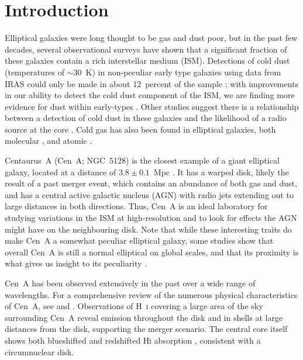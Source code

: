 \documentclass[useAMS,usenatbib,usegraphicx]{mn2e}
\begin{document}
\section{Introduction}\label{sec:intro}
Elliptical galaxies were long thought to be gas and dust poor, but in
the past few decades, several observational surveys 
have shown that a significant fraction of these galaxies contain a rich interstellar
medium (ISM).  Detections of cold dust (temperatures of $\sim 30$~K) in non-peculiar early type galaxies using data from IRAS could only be made in about 12~percent of the sample \citep[e.g.][]{1998ApJ...499..670B}; with improvements in our ability to detect the cold dust component of the ISM, we are finding more evidence for dust within early-types \citep[e.g.][]{2004ApJS..151..237T, 2004A&A...416...41X,2008ApJ...677..249L, 2009AJ....137.3053Y, Smith_2012_in_press}.  Other studies suggest there is a relationship between a detection of cold
dust in these galaxies and the likelihood of a radio source at the core \citep[e.g.][]{1989ApJ...337..209W}.  Cold gas has also been found in elliptical galaxies, both molecular \citep[i.e.][]{1989ApJ...344..747T, 1995A&A...297..643W, 2003ApJ...584..260W, 2011MNRAS.414..940Y}, and atomic \citep[e.g.][]{1985AJ.....90..454K, 1992ApJ...387..484B, 1994A&A...286..389H, 1995A&A...300..675H, 1999ASPC..163...84M, 2006MNRAS.371..157M, 2010ApJ...725..100W}.

Centaurus~A (Cen~A; NGC~5128) is the closest example of a giant elliptical galaxy, located at a distance of $3.8 \pm 0.1$~Mpc \citep{2010PASA...27..457H}. It has a warped disk, likely the result of a past merger event, which contains an abundance of both gas and dust, and has a central active galactic nucleus (AGN) with radio jets extending out to large distances in both directions.  Thus, Cen~A is an ideal laboratory for studying variations in the ISM at high-resolution and to look for effects the AGN might have on the neighbouring disk.  Note that while these interesting traits do make Cen~A a somewhat peculiar elliptical galaxy, some studies show that overall Cen~A is still a normal elliptical on global scales, and that its proximity is what gives us insight to its peculiarity \citep[e.g.][]{2010PASA...27..475H}.

Cen~A has been observed extensively in the past over a wide range of wavelengths.  For a comprehensive review of the numerous physical characteristics of Cen~A, see \citet{1998A&ARv...8..237I} and \citet{2010PASA...27..463M}.  Observations of H~\textsc{i} covering a large area of the sky surrounding Cen~A \citep[e.g][]{1990AJ.....99.1781V,1994ApJ...423L.101S,2008A&A...485L...5M,2010A&A...515A..67S} reveal emission throughout the disk and in shells at large distances from the disk, supporting the merger scenario.  The central core itself shows both blueshifted and redshifted H\textsc{i} absorption \citep{2008A&A...485L...5M,2010A&A...515A..67S}, consistent with a circumnuclear disk.
\end{document}
